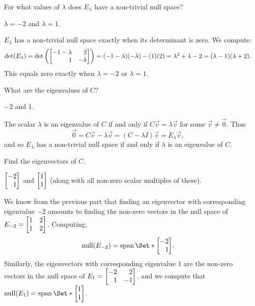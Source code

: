 	\begin{parts}
		\item For what values of $\lambda$ does $E_\lambda$ have a non-trivial
			null space?
			\begin{solution}
				$\lambda=-2$ and $\lambda=1$. 

				$E_\lambda$ has a non-trivial null space exactly when its 
				determinant is zero. We compute:
				\[
					\det(E_\lambda)
					=\det\left(\mat{-1-\lambda&2\\1&-\lambda}\right)
					=(-1-\lambda)(-\lambda)-(1)(2)
					=\lambda^2+\lambda-2
					=(\lambda-1)(\lambda+2).
				\]
				This equals zero exactly when $\lambda=-2$ or $\lambda=1$.
			\end{solution}
		\item What are the eigenvalues of $C$?
			\begin{solution}
				$-2$ and $1$.

				The scalar $\lambda$ is an eigenvalue of $C$ if and only if $C\vec v=\lambda \vec v$ for
				some $\vec v\neq \vec 0$. Thus
				\[
					\vec 0=C\vec v-\lambda \vec v=(C-\lambda I)\vec v=E_\lambda \vec v,
				\]
				and so $E_{\lambda}$ has a non-trivial null space if and only if $\lambda$ is
				an eigenvalue of $C$.
			\end{solution}
		\item Find the eigenvectors of $C$.
			\begin{solution}
				$\mat{-2\\1}$ and $\mat{1\\1}$ (along with all non-zero scalar
				multiples of these).

				We know from the previous part that finding an eigenvector with
				corresponding eigenvalue $-2$ amounts to finding the non-zero 
				vectors	in the null space of  
				$E_{-2}=\mat{1&2\\1&2}$. Computing,
				\[\Null(E_{-2})=\Span\Set*{\mat{-2\\1}}.\]
				Similarly, the eigenvectors with corresponding eigenvalue $1$ are
				the non-zero vectors in the null space of $E_1=\mat{-2&2\\1&-1}$, 
				and we compute that $\Null(E_1)=\Span\Set*{\mat{1\\1}}$.
			\end{solution}
	\end{parts}

